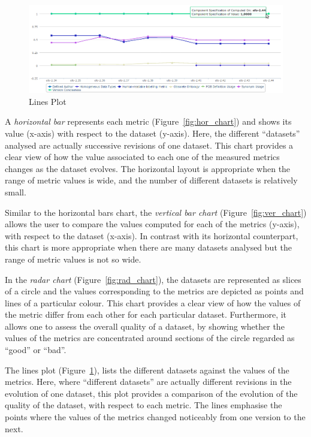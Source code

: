 \begin{figure}[tbph]
\center
\includegraphics[scale=0.3]{images/cube_4.png} 
\caption{Lines Plot} 
\label{fig:line_chart}
\end{figure}

A \emph{horizontal bar} represents each metric (Figure~\ref{fig:hor_chart}) and shows its value (x-axis) with respect to the dataset (y-axis).
Here, the different “datasets” analysed are actually successive revisions of one dataset.
This chart provides a clear view of how the value associated to each one of the measured metrics changes as the dataset evolves.
The horizontal layout is appropriate when the range of metric values is wide, and the number of different datasets is relatively small.

Similar to the horizontal bars chart, the \emph{vertical bar chart} (Figure~\ref{fig:ver_chart}) allows the user to compare the values computed for each of the metrics (y-axis), with respect to the dataset (x-axis).
In contrast with its horizontal counterpart, this chart is more appropriate when there are many datasets analysed but the range of metric values is not so wide.

In the \emph{radar chart} (Figure~\ref{fig:rad_chart}), the datasets are represented as slices of a circle and the values corresponding to the metrics are depicted as points and lines of a particular colour.
This chart provides a clear view of how the values of the metric differ from each other for each particular dataset. 
Furthermore, it allows one to assess the overall quality of a dataset, by showing whether the values of the metrics are concentrated around sections of the circle regarded as “good” or “bad”.

The lines plot (Figure~\ref{fig:line_chart}), lists the different datasets against the values of the metrics.
Here, where “different datasets” are actually different revisions in the evolution of one dataset, this plot provides a comparison of the evolution of the quality of the dataset, with respect to each metric.
The lines emphasise the points where the values of the metrics changed noticeably from one version to the next.




